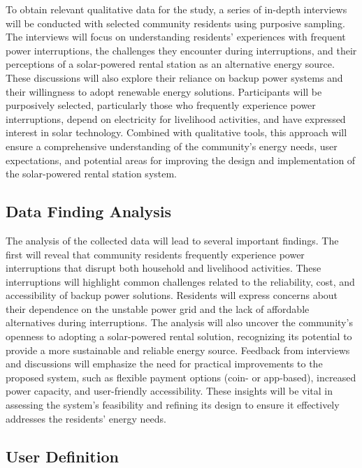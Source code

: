 {To obtain relevant qualitative data for the study, a series of in-depth interviews will be conducted with selected community residents using purposive sampling. The interviews will focus on understanding residents’ experiences with frequent power interruptions, the challenges they encounter during interruptions, and their perceptions of a solar-powered rental station as an alternative energy source. These discussions will also explore their reliance on backup power systems and their willingness to adopt renewable energy solutions. Participants will be purposively selected, particularly those who frequently experience power interruptions, depend on electricity for livelihood activities, and have expressed interest in solar technology. Combined with qualitative tools, this approach will ensure a comprehensive understanding of the community’s energy needs, user expectations, and potential areas for improving the design and implementation of the solar-powered rental station system.

\subsection{Data Finding Analysis}

The analysis of the collected data will lead to several important findings. The first will reveal that community residents frequently experience power interruptions that disrupt both household and livelihood activities. These interruptions will highlight common challenges related to the reliability, cost, and accessibility of backup power solutions. Residents will express concerns about their dependence on the unstable power grid and the lack of affordable alternatives during interruptions. The analysis will also uncover the community’s openness to adopting a solar-powered rental solution, recognizing its potential to provide a more sustainable and reliable energy source. Feedback from interviews and discussions will emphasize the need for practical improvements to the proposed system, such as flexible payment options (coin- or app-based), increased power capacity, and user-friendly accessibility. These insights will be vital in assessing the system’s feasibility and refining its design to ensure it effectively addresses the residents’ energy needs.

\subsection{User Definition}

}
